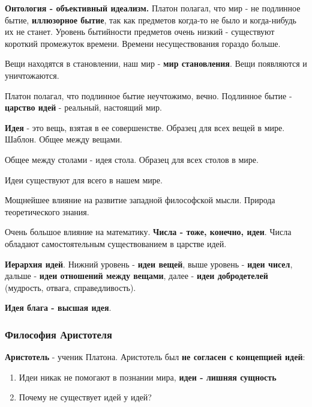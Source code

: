 \documentclass{article}
\begin{document}
\begin{flushleft}
\hfill

\textbf{Онтология - объективный идеализм.} Платон полагал, что мир - не подлинное бытие, \textbf{иллюзорное бытие}, так как предметов когда-то не было и когда-нибудь их не станет. Уровень бытийности предметов очень низкий - существуют короткий промежуток времени. Времени несуществования гораздо больше.

Вещи находятся в становлении, наш мир - \textbf{мир становления}. Вещи появляются и уничтожаются.

Платон полагал, что подлинное бытие неучтожимо, вечно. Подлинное бытие - \textbf{царство идей} - реальный, настоящий мир.

\hfill

\textbf{Идея} - это вещь, взятая в ее совершенстве. Образец для всех вещей в мире. Шаблон. Общее между вещами.

Общее между столами - идея стола. Образец для всех столов в мире.

Идеи существуют для всего в нашем мире.

\hfill

Мощнейшее влияние на развитие западной философской мысли. Природа теоретического знания.

\hfill

Очень большое влияние на математику. \textbf{Числа - тоже, конечно, идеи}. Числа обладают самостоятельным существованием в царстве идей.

\hfill

\textbf{Иерархия идей}. Нижний уровень - \textbf{идеи вещей}, выше уровень - \textbf{идеи чисел}, дальше - \textbf{идеи отношений между вещами}, далее - \textbf{идеи добродетелей} (мудрость, отвага, справедливость).

\textbf{Идея блага - высшая идея}.

\subsubsection{Философия Аристотеля}

\textbf{Аристотель} - ученик Платона. Аристотель был \textbf{не согласен с концепцией идей}:

\begin{enumerate}
    \item Идеи никак не помогают в познании мира, \textbf{идеи - лишняя сущность}
    \item Почему не существует идей у идей?
\end{enumerate}


\end{flushleft}
\end{document}
